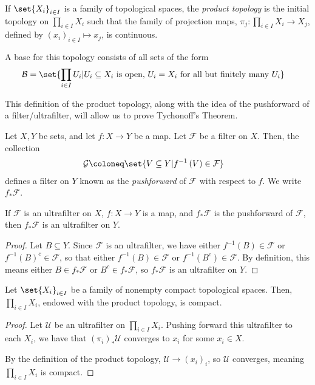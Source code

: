 \documentclass[11pt]{mypackage}
\begin{document}
\begin{definition}
  If $\set{X_i}_{i\in I}$ is a family of topological spaces, the \textit{product topology} is the initial topology on $\prod_{i\in I}X_i$ such that the family of projection maps, $\pi_j\colon \prod_{i\in I}X_i\rightarrow X_j$, defined by $\left( x_i \right)_{i\in I} \mapsto x_j$, is continuous.\newline

  A base for this topology consists of all sets of the form
  \begin{align*}
    \mathcal{B} &= \set{\prod_{i\in I}U_{i} | U_i\subseteq X_i\text{ is open, }U_i = X_i\text{ for all but finitely many }U_i}
  \end{align*}
\end{definition}
This definition of the product topology, along with the idea of the pushforward of a filter/ultrafilter, will allow us to prove Tychonoff's Theorem.
\begin{definition}
  Let $X,Y$ be sets, and let $f\colon X\rightarrow Y$ be a map. Let $\mathcal{F}$ be a filter on $X$. Then, the collection
  \begin{align*}
    \mathcal{G} &\coloneq \set{V\subseteq Y | f^{-1}\left( V \right) \in \mathcal{F}}
  \end{align*}
  defines a filter on $Y$ known as the \textit{pushforward} of $\mathcal{F}$ with respect to $f$. We write $f_{\ast}\mathcal{F}$.
\end{definition}
\begin{proposition}
  If $\mathcal{F}$ is an ultrafilter on $X$, $f\colon X\rightarrow Y$ is a map, and $f_{\ast}\mathcal{F}$ is the pushforward of $\mathcal{F}$, then $f_{\ast}\mathcal{F}$ is an ultrafilter on $Y$.
\end{proposition}
\begin{proof}
  Let $B\subseteq Y$. Since $\mathcal{F}$ is an ultrafilter, we have either $f^{-1}\left( B \right)\in \mathcal{F}$ or $f^{-1}\left( B \right)^{c}\in \mathcal{F}$, so that either $f^{-1}\left( B \right)\in \mathcal{F}$ or $f^{-1}\left( B^{c} \right)\in \mathcal{F}$. By definition, this means either $B\in f_{\ast}\mathcal{F}$ or $B^{c}\in f_{\ast}\mathcal{F}$, so $f_{\ast}\mathcal{F}$ is an ultrafilter on $Y$.
\end{proof}
\begin{theorem}
  Let $\set{X_i}_{i\in I}$ be a family of nonempty compact topological spaces. Then, $\prod_{i\in I}X_i$, endowed with the product topology, is compact.
\end{theorem}
\begin{proof}
  Let $\mathcal{U}$ be an ultrafilter on $\prod_{i\in I}X_i$. Pushing forward this ultrafilter to each $X_i$, we have that $\left( \pi_i \right)_{\ast}\mathcal{U}$ converges to $ x_i$ for some $x_i\in X$.\newline

  By the definition of the product topology, $\mathcal{U}\rightarrow \left( x_i \right)_{i}$, so $\mathcal{U}$ converges, meaning $\prod_{i\in I}X_i$ is compact.
\end{proof}
\end{document}
